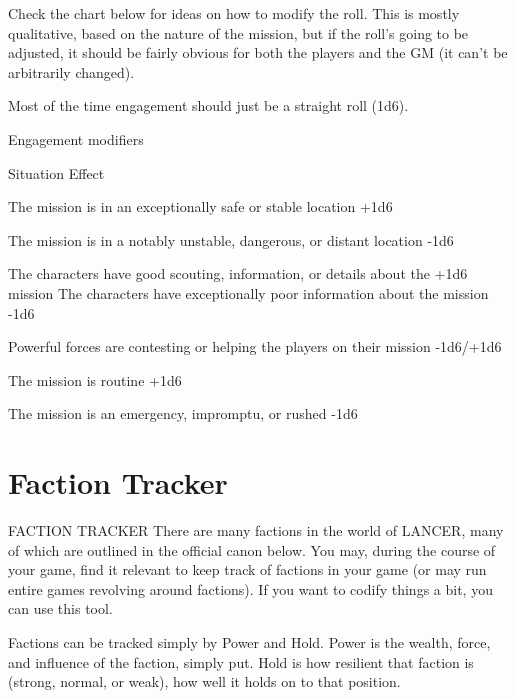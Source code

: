 Check the chart below for ideas on how to modify the roll. This is mostly qualitative, based on  
the nature of the mission, but if the roll’s going to be adjusted, it should be fairly obvious for both  
the players and the GM (it can’t be arbitrarily changed).
 

Most of the time engagement should just be a straight roll (1d6).  

                                         Engagement modifiers
 

                                                                                                          


 Situation                                                                             Effect 

 The mission is in an exceptionally safe or stable location                            +1d6 

 The mission is in a notably unstable, dangerous, or distant location                  -1d6 

 The characters have good scouting, information, or details about the                  +1d6 
 mission 
 The characters have exceptionally poor information about the mission                  -1d6 

 Powerful forces are contesting or helping the players on their mission                -1d6/+1d6 

 The mission is routine                                                                +1d6 

 The mission is an emergency, impromptu, or rushed                                     -1d6 

\chapter{Faction Tracker}
                                       FACTION TRACKER  
There are many factions in the world of LANCER, many of which are outlined in the official canon  
below. You may, during the course of your game, find it relevant to keep track of factions in your  
game (or may run entire games revolving around factions). If you want to codify things a bit, you  
can use this tool.  

Factions can be tracked simply by Power and Hold. Power is the wealth, force, and influence of  
the faction, simply put. Hold is how resilient that faction is (strong, normal, or weak), how well it  
holds on to that position.  

